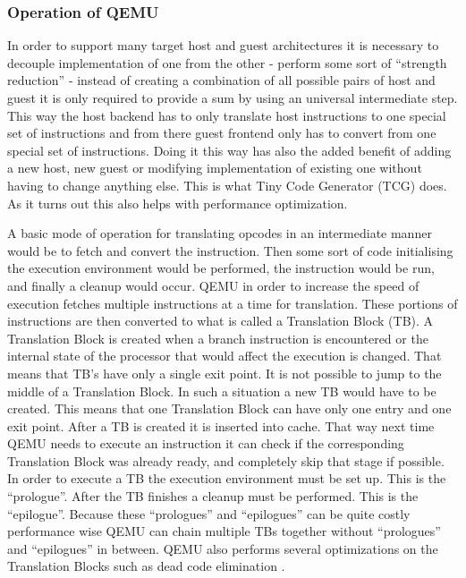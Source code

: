 \subsubsection{Operation of QEMU}

In order to support many target host and guest architectures it is necessary to
decouple implementation of one from the other - perform some sort of ``strength
reduction'' - instead of creating a combination of all possible pairs of host
and guest it is only required to provide a sum by using an universal
intermediate step. This way the host backend has to only translate host
instructions to one special set of instructions and from there guest frontend
only has to convert from one special set of instructions. Doing it this way has
also the added benefit of adding a new host, new guest or modifying
implementation of existing one without having to change anything else. This is
what Tiny Code Generator (TCG) does. As it turns out this also helps with
performance optimization.

A basic mode of operation for translating opcodes in an intermediate manner
would be to fetch and convert the instruction. Then some sort of code
initialising the execution environment would be performed, the instruction would
be run, and finally a cleanup would occur. QEMU in order to increase the speed
of execution fetches multiple instructions at a time for translation.  These
portions of instructions are then converted to what is called a Translation
Block (TB). A Translation Block is created when a branch instruction is
encountered or the internal state of the processor that would affect the
execution is changed. That means that TB's have only a single exit point. It is
not possible to jump to the middle of a Translation Block. In such a situation
a new TB would have to be created. This means that one Translation Block can
have only one entry and one exit point. After a TB is created it is inserted
into cache. That way next time QEMU needs to execute an instruction it can check
if the corresponding Translation Block was already ready, and completely skip
that stage if possible. In order to execute a TB the execution environment must
be set up. This is the ``prologue''. After the TB finishes a cleanup must be
performed. This is the ``epilogue''. Because these ``prologues'' and
``epilogues'' can be quite costly performance wise QEMU can chain multiple TBs
together without ``prologues'' and ``epilogues'' in between. QEMU also performs
several optimizations on the Translation Blocks such as dead code elimination
\cite{qemu2022}.

